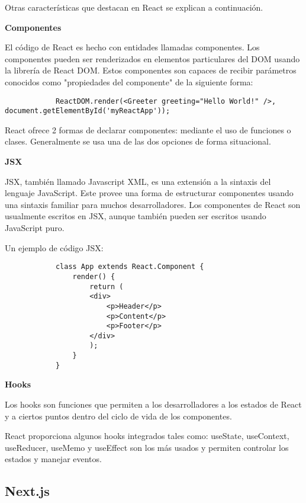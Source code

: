 Otras características que destacan en React se explican a continuación.

    \noindent \textbf{Componentes} \hfill

        El código de React es hecho con entidades llamadas componentes. Los componentes pueden ser renderizados en elementos particulares del DOM usando la librería de React DOM. Estos componentes son capaces de recibir parámetros conocidos como "propiedades del componente" de la siguiente forma: \hfill 

        \begin{lstlisting}
            ReactDOM.render(<Greeter greeting="Hello World!" />, document.getElementById('myReactApp'));
        \end{lstlisting}

        React ofrece 2 formas de declarar componentes: mediante el uso de funciones o clases. Generalmente se usa una de las dos opciones de forma situacional.

   \noindent \textbf{JSX} \hfill

        JSX, también llamado Javascript XML, es una extensión a la sintaxis del lenguaje JavaScript. Este provee una forma de estructurar componentes usando una sintaxis familiar para muchos desarrolladores. Los componentes de React son usualmente escritos en JSX, aunque también pueden ser escritos usando JavaScript puro.

        Un ejemplo de código JSX:

        \begin{lstlisting}
            class App extends React.Component {
                render() {
                    return (
                    <div>
                        <p>Header</p>
                        <p>Content</p>
                        <p>Footer</p>
                    </div>
                    );
                }
            }
        \end{lstlisting}

   \noindent \textbf{Hooks} \hfill 

        Los hooks son funciones que permiten a los desarrolladores  a los estados de React y a ciertos puntos dentro del ciclo de vida de los componentes.

        React proporciona algunos hooks integrados tales como: useState, useContext, useReducer, useMemo y useEffect son los más usados y permiten controlar los estados y manejar eventos.


\subsection{Next.js}

